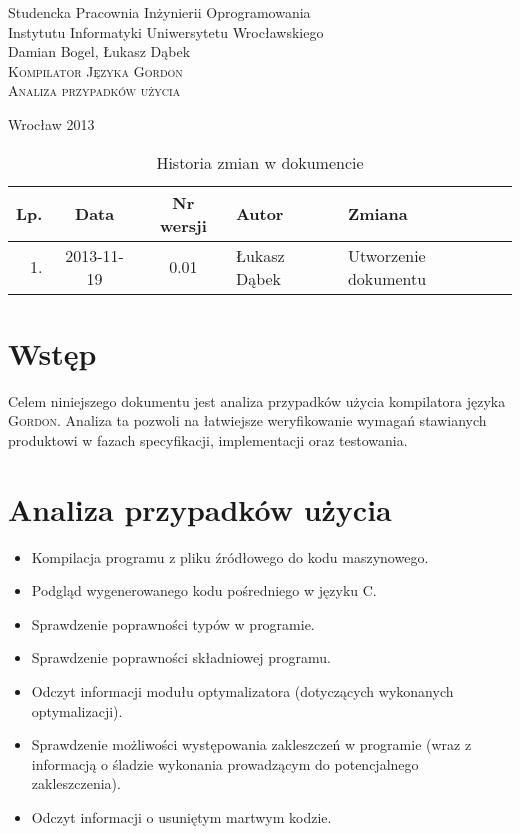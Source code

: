 \documentclass{documentation}
\begin{document}
\begin{titlepage}
\begin{center}
Studencka Pracownia Inżynierii Oprogramowania\\
Instytutu Informatyki Uniwersytetu Wrocławskiego\\[6cm]

Damian Bogel, Łukasz Dąbek\\[1cm]
\textsc{\LARGE Kompilator Języka Gordon}\\[0.5cm]
\textsc{\large Analiza przypadków użycia}

\vfill
Wrocław 2013 \\[2.5cm]

\end{center}
\end{titlepage}

\newpage
\begin{table}
	\centering
    \captionsetup{name=Tabela}
	\caption{Historia zmian w dokumencie}
		\begin{tabular}{|r|c|c|l|l|}
		\hline
		Lp.  & Data       & Nr wersji & Autor                 & Zmiana \\ \hline
		1.   & 2013-11-19 & 0.01 & Łukasz Dąbek & Utworzenie dokumentu \\ \hline
	\end{tabular}
\end{table}
\newpage

\tableofcontents
\setcounter{page}{2}

\newpage

\section{Wstęp}
\noindent Celem niniejszego dokumentu jest analiza przypadków użycia kompilatora
języka \textsc{Gordon}. Analiza ta pozwoli na łatwiejsze weryfikowanie wymagań
stawianych produktowi w fazach specyfikacji, implementacji oraz testowania.

\section{Analiza przypadków użycia}
\begin{itemize}
    \item Kompilacja programu z pliku źródłowego do kodu maszynowego.
    \item Podgląd wygenerowanego kodu pośredniego w języku \textsc{C}.
    \item Sprawdzenie poprawności typów w programie.
    \item Sprawdzenie poprawności składniowej programu.
    \item Odczyt informacji modułu optymalizatora (dotyczących wykonanych optymalizacji).
    \item Sprawdzenie możliwości występowania zakleszczeń w programie (wraz z informacją
        o śladzie wykonania prowadzącym do potencjalnego zakleszczenia).
    \item Odczyt informacji o usuniętym martwym kodzie. 
\end{itemize}
\end{document}
